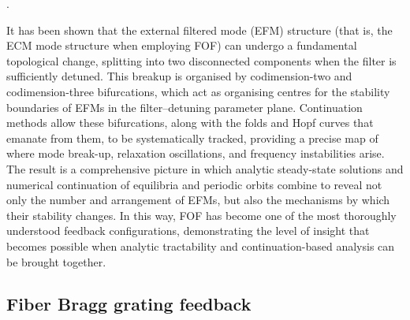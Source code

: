 \cite{erzgraber2006frequency, erzgraber2007bifurcation, erzgraber2007dynamics, fischer2000experimental, fischer2004experimental, green2006mode, 
hek2007semiconductor, erzgraber2007feedback, fischer2004filtered, yousefi2001global, yousefi2002simulations, yousefi2003nonlinear}. 
%
\par
%
It has been shown that the external filtered mode (EFM) structure (that is, the ECM mode structure when employing FOF) can undergo a fundamental topological change, splitting into two disconnected components when the filter is sufficiently detuned.
This breakup is organised by codimension-two and codimension-three bifurcations, which act as organising centres for the stability boundaries of EFMs in the filter–detuning parameter plane.
Continuation methods allow these bifurcations, along with the folds and Hopf curves that emanate from them, to be systematically tracked, providing a precise map of where mode break-up, relaxation oscillations, and frequency instabilities arise. 
The result is a comprehensive picture in which analytic steady-state solutions and numerical continuation of equilibria and periodic orbits combine to reveal not only the number and arrangement of EFMs, but also the mechanisms by which their stability changes. 
In this way, FOF has become one of the most thoroughly understood feedback configurations, demonstrating the level of insight that becomes possible when analytic tractability and continuation-based analysis can be brought together.
%
%
\subsection*{Fiber Bragg grating feedback}
\label{subsec:FBG_LK}
%
